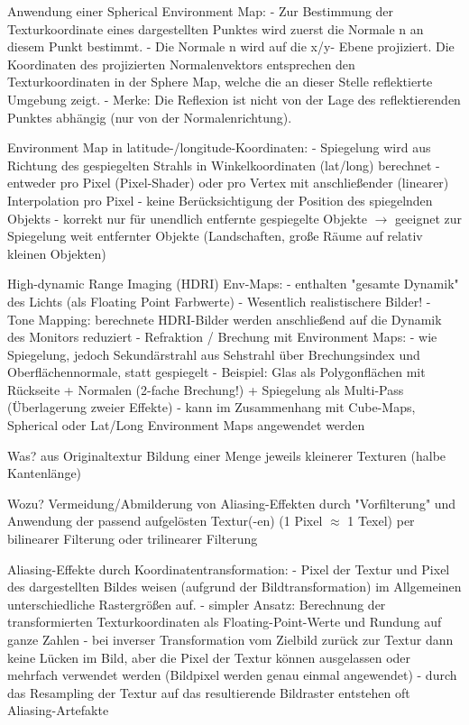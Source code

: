 \documentclass[10pt,landscape]{article}
\makeatletter
\renewcommand{\subsection}{\@startsection{subsection}{2}{0mm}%
                                {-1explus -.5ex minus -.2ex}%
                                {0.5ex plus .2ex}%
                                {\normalfont\normalsize\bfseries}}
\makeatother
\begin{document}
\begin{multicols}{3}
  Anwendung einer Spherical Environment Map:
  - Zur Bestimmung der Texturkoordinate eines dargestellten Punktes wird zuerst die Normale n an diesem Punkt bestimmt.
  - Die Normale n wird auf die x/y- Ebene projiziert. Die Koordinaten des projizierten Normalenvektors entsprechen den Texturkoordinaten in der Sphere Map, welche die an dieser Stelle reflektierte Umgebung zeigt.
  - Merke: Die Reflexion ist nicht von der Lage des reflektierenden Punktes abhängig (nur von der Normalenrichtung).
  
  Environment Map in latitude-/longitude-Koordinaten:
  - Spiegelung wird aus Richtung des gespiegelten Strahls in Winkelkoordinaten (lat/long) berechnet
  - entweder pro Pixel (Pixel-Shader) oder pro Vertex mit anschließender (linearer) Interpolation pro Pixel
  - keine Berücksichtigung der Position des spiegelnden Objekts 
  - korrekt nur für unendlich entfernte gespiegelte Objekte $\rightarrow$ geeignet zur Spiegelung weit entfernter Objekte (Landschaften, große Räume auf relativ kleinen Objekten)
  
  
  High-dynamic Range Imaging (HDRI) Env-Maps:
  - enthalten "gesamte Dynamik" des Lichts (als Floating Point Farbwerte)
  - Wesentlich realistischere Bilder!
  - Tone Mapping: berechnete HDRI-Bilder werden anschließend auf die Dynamik des Monitors reduziert
  - Refraktion / Brechung mit Environment Maps:
  - wie Spiegelung, jedoch Sekundärstrahl aus Sehstrahl über Brechungsindex und Oberflächennormale, statt gespiegelt
  - Beispiel: Glas als Polygonflächen mit Rückseite + Normalen (2-fache Brechung!) + Spiegelung als Multi-Pass (Überlagerung zweier Effekte)
  - kann im Zusammenhang mit Cube-Maps, Spherical oder Lat/Long Environment Maps angewendet werden
  
  
  Was? aus Originaltextur Bildung einer Menge jeweils kleinerer Texturen (halbe Kantenlänge)
  
  Wozu? Vermeidung/Abmilderung von Aliasing-Effekten durch "Vorfilterung" und Anwendung der passend aufgelösten Textur(-en) (1 Pixel $\approx$ 1 Texel) per bilinearer Filterung oder trilinearer Filterung
  
  Aliasing-Effekte durch Koordinatentransformation:
  - Pixel der Textur und Pixel des dargestellten Bildes weisen (aufgrund der Bildtransformation) im Allgemeinen unterschiedliche Rastergrößen auf.
  - simpler Ansatz: Berechnung der transformierten Texturkoordinaten als Floating-Point-Werte und Rundung auf ganze Zahlen
  - bei inverser Transformation vom Zielbild zurück zur Textur dann keine Lücken im Bild, aber die Pixel der Textur können ausgelassen oder mehrfach verwendet werden (Bildpixel werden genau einmal angewendet)
  - durch das Resampling der Textur auf das resultierende Bildraster entstehen oft Aliasing-Artefakte
  

\end{multicols}
\end{document}
